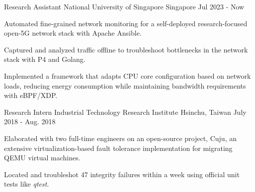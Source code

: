 
\vspace{-2mm}

\begin{cventries}

  \cventry
    {Research Assistant} %
    {National University of Singapore} %
    {Singapore} %
    {Jul 2023 - Now} %
    {
      \begin{cvitems} %
        \item {Automated fine-grained network monitoring for a self-deployed research-focused open-5G network stack with Apache Ansible.}
        \item {Captured and analyzed traffic offline to troubleshoot bottlenecks in the network stack with P4 and Golang.}
        \item {Implemented a framework that adapts CPU core configuration based on network loads, reducing energy consumption while maintaining bandwidth requirements with eBPF/XDP.}
      \end{cvitems}
    }

    \vspace{-2mm}

  \cventry
    {Research Intern} %
    {Industrial Technology Research Institute} %
    {Hsinchu, Taiwan} %
    {July 2018 - Aug. 2018} %
    {
      \begin{cvitems} %
        \item {Elaborated with two full-time engineers on an open-source project, Cuju, an extensive virtualization-based fault tolerance implementation for migrating
        QEMU virtual machines.
        }
        \item {Located and troubleshot 47 integrity failures within a week using official unit tests like \emph{qtest}.
        }
      \end{cvitems}
    }

\end{cventries}
